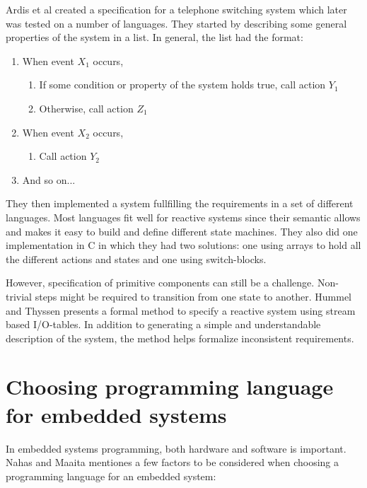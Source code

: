 Ardis et al \cite{ardis1996framework} created a specification for a telephone
switching system which later was tested on a number of languages. They started
by describing some general properties of the system in a list. In general, the
list had the format:

\begin{enumerate}
\item
  When event $X_1$ occurs,
\begin{enumerate}
\item
  If some condition or property of the system holds true, call action $Y_1$
\item
  Otherwise, call action $Z_1$
\end{enumerate}

\item
  When event $X_2$ occurs,
\begin{enumerate}
\item
  Call action $Y_2$
\end{enumerate}

\item
  And so on...
\end{enumerate}

They then implemented a system fullfilling the requirements in a set of
different languages. Most languages fit well for reactive systems since their
semantic allows and makes it easy to build and define different state machines.
They also did one implementation in C in which they had two solutions: one
using arrays to hold all the different actions and states and one using
switch-blocks.

However, specification of primitive components can still be a challenge.
Non-trivial steps might be required to transition from one state to another.
Hummel and Thyssen \cite{hummel2009behavioral} presents a formal method to
specify a reactive system using stream based I/O-tables. In addition to
generating a simple and understandable description of the system, the method
helps formalize inconsistent requirements.

\section{Choosing programming language for embedded systems}

In embedded systems programming, both hardware and software is important. Nahas
and Maaita \cite{nahas2012choosing} mentiones a few factors to be considered
when choosing a programming language for an embedded system:

